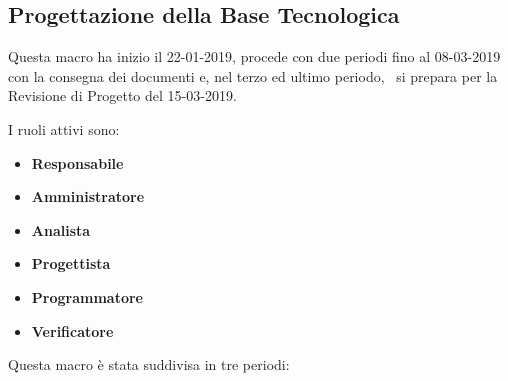 		\newpage
		
        \subsection{Progettazione della Base Tecnologica}
		Questa macro ha inizio il 22-01-2019, procede con due periodi fino al 08-03-2019 con la consegna
		dei documenti e, nel terzo ed ultimo periodo, \gruppo\ si prepara per la Revisione di Progetto del 15-03-2019.
        
        I ruoli attivi sono: 
        \begin{itemize}
            \item \textbf{Responsabile}
            \item \textbf{Amministratore}
            \item \textbf{Analista}
            \item \textbf{Progettista}
            \item \textbf{Programmatore}
            \item \textbf{Verificatore}
        \end{itemize}
        Questa macro è stata suddivisa in tre periodi:

